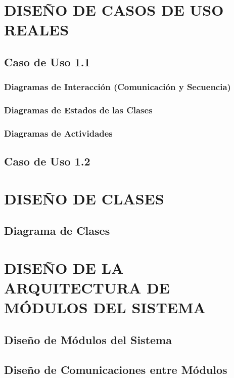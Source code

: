 \documentclass[11pt]{report} %
\begin{document}
\newpage


\section{DISEÑO DE CASOS DE USO REALES}

\subsection{Caso de Uso 1.1} 

\subsubsection{Diagramas de Interacción (Comunicación y Secuencia)} 

\subsubsection{Diagramas de Estados de las Clases} 
 
\subsubsection{Diagramas de Actividades} 


\subsection{Caso de Uso 1.2}


\newpage
\section{DISEÑO DE CLASES}

\subsection{Diagrama de Clases}


\newpage
\section{DISEÑO DE LA ARQUITECTURA DE MÓDULOS DEL SISTEMA}

\subsection{Diseño de Módulos del Sistema}

\subsection{Diseño de Comunicaciones entre Módulos}
\end{document}
